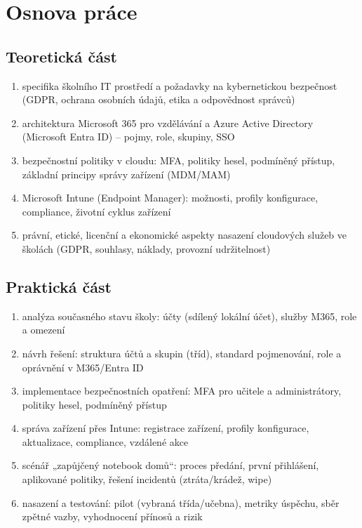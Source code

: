 \documentclass[a4paper]{article}
\begin{document}
\section*{Osnova práce}

\subsection*{Teoretická část}
\begin{enumerate}
\item specifika školního IT prostředí a požadavky na kybernetickou bezpečnost (GDPR, ochrana osobních údajů, etika a odpovědnost správců)
\item architektura Microsoft 365 pro vzdělávání a Azure Active Directory (Microsoft Entra ID) – pojmy, role, skupiny, SSO
\item bezpečnostní politiky v cloudu: MFA, politiky hesel, podmíněný přístup, základní principy správy zařízení (MDM/MAM)
\item Microsoft Intune (Endpoint Manager): možnosti, profily konfigurace, compliance, životní cyklus zařízení
\item právní, etické, licenční a ekonomické aspekty nasazení cloudových služeb ve školách (GDPR, souhlasy, náklady, provozní udržitelnost)
\end{enumerate}

\subsection*{Praktická část}
\begin{enumerate}
\item analýza současného stavu školy: účty (sdílený lokální účet), služby M365, role a omezení
\item návrh řešení: struktura účtů a skupin (tříd), standard pojmenování, role a oprávnění v M365/Entra ID
\item implementace bezpečnostních opatření: MFA pro učitele a administrátory, politiky hesel, podmíněný přístup
\item správa zařízení přes Intune: registrace zařízení, profily konfigurace, aktualizace, compliance, vzdálené akce
\item scénář „zapůjčený notebook domů“: proces předání, první přihlášení, aplikované politiky, řešení incidentů (ztráta/krádež, wipe)
\item nasazení a testování: pilot (vybraná třída/učebna), metriky úspěchu, sběr zpětné vazby, vyhodnocení přínosů a rizik
\end{enumerate}
\end{document}
